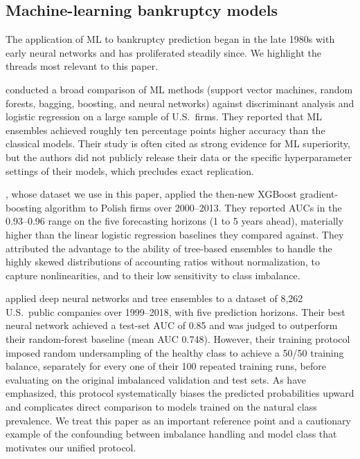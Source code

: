 \documentclass[11pt,a4paper]{article}
\begin{document}
\subsection{Machine-learning bankruptcy models}

The application of ML to bankruptcy prediction began in the late 1980s
with early neural networks \citep{odom1990} and has proliferated steadily
since. We highlight the threads most relevant to this paper.

\cite{barboza2017} conducted a broad comparison of ML methods (support
vector machines, random forests, bagging, boosting, and neural networks)
against discriminant analysis and logistic regression on a large sample of
U.S.\ firms. They reported that ML ensembles achieved roughly ten percentage
points higher accuracy than the classical models. Their study is often cited
as strong evidence for ML superiority, but the authors did not publicly
release their data or the specific hyperparameter settings of their models,
which precludes exact replication.

\cite{zieba2016}, whose dataset we use in this paper, applied the then-new
XGBoost gradient-boosting algorithm to Polish firms over 2000--2013. They
reported AUCs in the 0.93--0.96 range on the five forecasting horizons
(1 to 5 years ahead), materially higher than the linear logistic regression
baselines they compared against. They attributed the advantage to the
ability of tree-based ensembles to handle the highly skewed distributions of
accounting ratios without normalization, to capture nonlinearities, and to
their low sensitivity to class imbalance.

\cite{pellegrino2022} applied deep neural networks and tree ensembles to
a dataset of 8,262 U.S.\ public companies over 1999--2018, with five
prediction horizons. Their best neural network achieved a test-set AUC of
0.85 and was judged to outperform their random-forest baseline (mean AUC
0.748). However, their training protocol imposed random undersampling of
the healthy class to achieve a 50/50 training balance, separately for every
one of their 100 repeated training runs, before evaluating on the original
imbalanced validation and test sets. As \cite{king2001} have emphasized,
this protocol systematically biases the predicted probabilities upward and
complicates direct comparison to models trained on the natural class
prevalence. We treat this paper as an important reference point and a
cautionary example of the confounding between imbalance handling and model
class that motivates our unified protocol.
\end{document}
